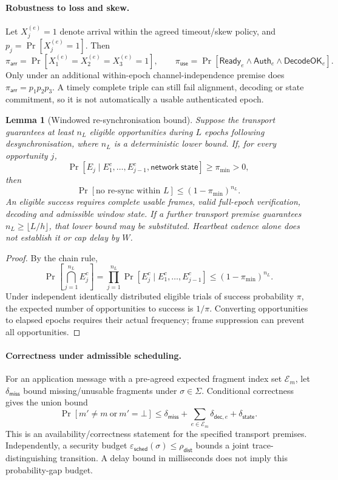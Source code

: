 \documentclass[pdflatex,sn-mathphys-num]{sn-jnl}%
\newtheorem{lemma}{Lemma}
\theoremstyle{definition}
\theoremstyle{game}
\theoremstyle{thmstyleone}%
\theoremstyle{thmstyletwo}%
\theoremstyle{thmstylethree}%
\begin{document}
\paragraph{Robustness to loss and skew.}
Let $X_j^{(e)}=1$ denote arrival within the agreed timeout/skew policy, and
$p_j=\Pr[X_j^{(e)}=1]$. Then
\[
\pi_{\mathsf{arr}}=\Pr[X_1^{(e)}=X_2^{(e)}=X_3^{(e)}=1],
\qquad
\pi_{\mathsf{use}}=\Pr[\mathsf{Ready}_e\wedge\mathsf{Auth}_e\wedge\mathsf{DecodeOK}_e].
\]
Only under an additional within-epoch channel-independence premise does
$\pi_{\mathsf{arr}}=p_1p_2p_3$. A timely complete triple can still fail
alignment, decoding or state commitment, so it is not automatically a
usable authenticated epoch.

\begin{lemma}[Windowed re-synchronisation bound]\label{lem:resync}
Suppose the transport guarantees at least $n_L$ eligible opportunities
during $L$ epochs following desynchronisation, where $n_L$ is a deterministic
lower bound. If, for every opportunity $j$,
\[
\Pr[E_j\mid E_1^c,\ldots,E_{j-1}^c,\mathsf{network\ state}]
\ge\pi_{\min}>0,
\]
then
\[
\Pr[\text{no re-sync within }L]\le(1-\pi_{\min})^{n_L}.
\]
An eligible success requires complete usable frames, valid full-epoch
verification, decoding and admissible window state. If a further transport
premise guarantees $n_L\ge\lfloor L/h\rfloor$, that lower bound may be
substituted. Heartbeat cadence alone does not establish it or cap delay by $W$.
\end{lemma}
\begin{proof}
By the chain rule,
\[
\Pr\!\left[\bigcap_{j=1}^{n_L}E_j^c\right]
=\prod_{j=1}^{n_L}\Pr[E_j^c\mid E_1^c,\ldots,E_{j-1}^c]
\le(1-\pi_{\min})^{n_L}.
\]
Under independent identically distributed eligible trials of success
probability $\pi$, the expected number of opportunities to success is
$1/\pi$. Converting opportunities to elapsed epochs requires their actual
frequency; frame suppression can prevent all opportunities.
\end{proof}

\paragraph{Correctness under admissible scheduling.}
For an application message with a pre-agreed expected fragment index set
$\mathcal E_m$, let $\delta_{\mathsf{miss}}$ bound missing/unusable fragments
under $\sigma\in\Sigma$. Conditional correctness gives the union bound
\[
\Pr[m'\ne m\ \text{or}\ m'=\bot]
\le\delta_{\mathsf{miss}}+
\sum_{e\in\mathcal E_m}\delta_{\mathsf{dec},e}+\delta_{\mathsf{state}}.
\]
This is an availability/correctness statement for the specified transport
premises. Independently, a security budget
$\varepsilon_{\mathsf{sched}}(\sigma)\le\rho_{\mathsf{dist}}$ bounds a joint
trace-distinguishing transition. A delay bound in milliseconds does not
imply this probability-gap budget.
\end{document}
